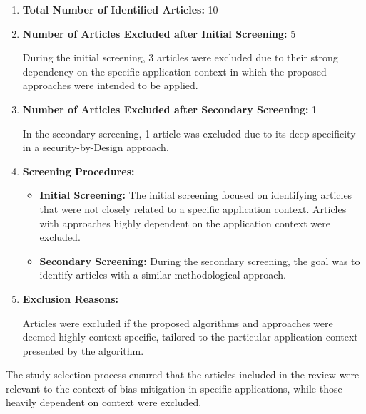 \documentclass{article}
\begin{document}
    \begin{enumerate}
        \item \textbf{Total Number of Identified Articles:} 10
        \item \textbf{Number of Articles Excluded after Initial Screening:} 5
        
        During the initial screening, 3 articles were excluded due to their strong dependency on the specific application context in which the proposed approaches were intended to be applied.
        
        \item \textbf{Number of Articles Excluded after Secondary Screening:} 1
        
        In the secondary screening, 1 article was excluded due to its deep specificity in a security-by-Design approach.
        
        \item \textbf{Screening Procedures:}
        
        \begin{itemize}
            \item \textbf{Initial Screening:} The initial screening focused on identifying articles that were not closely related to a specific application context. Articles with approaches highly dependent on the application context were excluded.
            
            \item \textbf{Secondary Screening:} During the secondary screening, the goal was to identify articles with a similar methodological approach.
        \end{itemize}
        
        \item \textbf{Exclusion Reasons:}
        
        Articles were excluded if the proposed algorithms and approaches were deemed highly context-specific, tailored to the particular application context presented by the algorithm.
    
    \end{enumerate}
    
    The study selection process ensured that the articles included in the review were relevant to the context of bias mitigation in specific applications, while those heavily dependent on context were excluded.
\end{document}
